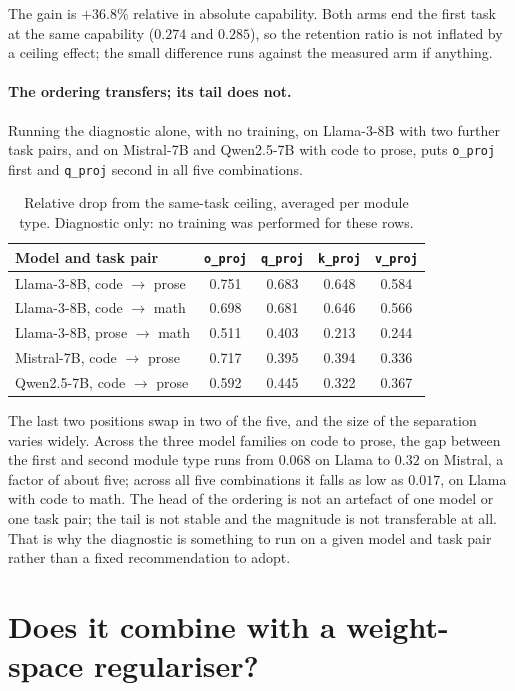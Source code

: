\documentclass[11pt]{article}
\begin{document}
The gain is $+36.8\%$ relative in absolute capability. Both arms end the first
task at the same capability ($0.274$ and $0.285$), so the retention ratio is not
inflated by a ceiling effect; the small difference runs against the measured arm
if anything.

\paragraph{The ordering transfers; its tail does not.} Running the diagnostic
alone, with no training, on Llama-3-8B with two further task pairs, and on
Mistral-7B and Qwen2.5-7B with code to prose, puts \texttt{o\_proj} first and
\texttt{q\_proj} second in all five combinations.

\begin{table}[ht]
\centering
\caption{Relative drop from the same-task ceiling, averaged per module type.
Diagnostic only: no training was performed for these rows.}
\begin{tabular}{lcccc}
\toprule
Model and task pair & \texttt{o\_proj} & \texttt{q\_proj} & \texttt{k\_proj} & \texttt{v\_proj} \\
\midrule
Llama-3-8B, code $\to$ prose & 0.751 & 0.683 & 0.648 & 0.584 \\
Llama-3-8B, code $\to$ math & 0.698 & 0.681 & 0.646 & 0.566 \\
Llama-3-8B, prose $\to$ math & 0.511 & 0.403 & 0.213 & 0.244 \\
Mistral-7B, code $\to$ prose & 0.717 & 0.395 & 0.394 & 0.336 \\
Qwen2.5-7B, code $\to$ prose & 0.592 & 0.445 & 0.322 & 0.367 \\
\bottomrule
\end{tabular}
\end{table}

The last two positions swap in two of the five, and the size of the separation
varies widely. Across the three model families on code to prose, the gap between
the first and second module type runs from $0.068$ on Llama to $0.32$ on
Mistral, a factor of about five; across all five combinations it falls as low as
$0.017$, on Llama with code to math. The head of the ordering is not an artefact
of one model or one task pair; the tail is not stable and the magnitude is not
transferable at all. That is why the
diagnostic is something to run on a given model and task pair rather than a
fixed recommendation to adopt.

\section{Does it combine with a weight-space regulariser?}
\label{sec:combina}
\end{document}
